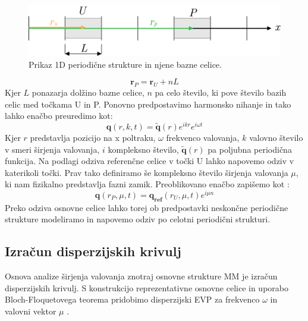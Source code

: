 \documentclass[12pt]{report}
\begin{document}
\begin{figure}[H]
  \centering
  \includegraphics{Images/bloch.png}
  \caption{Prikaz 1D periodične strukture in njene bazne celice.}
\end{figure}
\begin{equation}
  \mathbf{r}_P = \mathbf{r}_U + nL
\end{equation}
Kjer $L$ ponazarja dolžino bazne celice, $n$ pa celo število, ki pove število bazih celic med točkama U in P. Ponovno predpostavimo harmonsko
nihanje in tako lahko enačbo preuredimo kot:
\begin{equation}
  \mathbf{q}(r, k, t)  = \widetilde{\mathbf{q}}(r)e^{ik r}e^{i\omega t}
\end{equation}
Kjer $r$ predstavlja pozicijo na x poltraku, $\omega$ frekvenco valovanja, $k$ valovno število v smeri širjenja valovanja, $i$ kompleksno število, $\widetilde{\mathbf{q}}(r)$ pa poljubna periodična funkcija. Na podlagi odziva referenčne celice
v točki U lahko napovemo odziv v katerikoli točki. Prav tako definiramo še kompleksno število širjenja valovanja $\mu$, ki nam fizikalno predstavlja fazni zamik. Preoblikovano enačbo zapišemo
kot \cite{kosir}:
\begin{equation}
  \mathbf{q}(r_P, \mu, t)  = \mathbf{q_{ref}}(r_U, \mu,t)e^{i\mu n}
\end{equation} 
Preko odziva osnovne celice lahko torej ob predpostavki neskončne periodične strukture modeliramo in napovemo odziv po celotni
periodični strukturi.

\subsection{Izračun disperzijskih krivulj}
Osnova analize širjenja valovanja znotraj osnovne strukture \ac{MM} je izračun disperzijskih krivulj. S konstrukcijo reprezentativne
osnovne celice in uporabo Bloch-Floquetovega teorema pridobimo disperzijski \ac{EVP} za frekvenco $\omega$ in valovni vektor $\mu$ \cite{vanbelle}.
\end{document}
